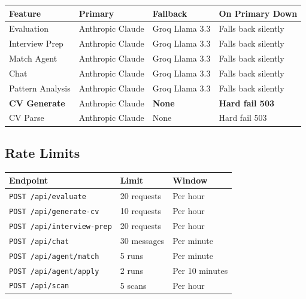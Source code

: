 \documentclass[11pt, a4paper]{article}
\newcommand{\api}[1]{\texttt{\textcolor{accent}{#1}}}
\begin{document}
\begin{center}
\begin{tabular}{llll}
  \toprule
  \textbf{Feature} & \textbf{Primary} & \textbf{Fallback} & \textbf{On Primary Down} \\
  \midrule
  Evaluation         & Anthropic Claude & Groq Llama 3.3 & Falls back silently \\
  Interview Prep     & Anthropic Claude & Groq Llama 3.3 & Falls back silently \\
  Match Agent        & Anthropic Claude & Groq Llama 3.3 & Falls back silently \\
  Chat               & Anthropic Claude & Groq Llama 3.3 & Falls back silently \\
  Pattern Analysis   & Anthropic Claude & Groq Llama 3.3 & Falls back silently \\
  \textbf{CV Generate} & Anthropic Claude & \textbf{None} & \textbf{Hard fail 503} \\
  CV Parse           & Anthropic Claude & None           & Hard fail 503 \\
  \bottomrule
\end{tabular}
\end{center}

\subsection{Rate Limits}

\begin{center}
\begin{tabular}{lll}
  \toprule
  \textbf{Endpoint} & \textbf{Limit} & \textbf{Window} \\
  \midrule
  \api{POST /api/evaluate}        & 20 requests & Per hour \\
  \api{POST /api/generate-cv}     & 10 requests & Per hour \\
  \api{POST /api/interview-prep}  & 20 requests & Per hour \\
  \api{POST /api/chat}            & 30 messages & Per minute \\
  \api{POST /api/agent/match}     & 5 runs      & Per minute \\
  \api{POST /api/agent/apply}     & 2 runs      & Per 10 minutes \\
  \api{POST /api/scan}            & 5 scans     & Per hour \\
  \bottomrule
\end{tabular}
\end{center}
\end{document}
